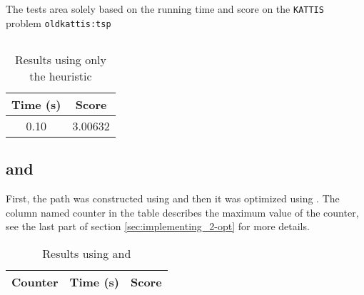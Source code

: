 The tests area solely based on the running time and score on the
\texttt{KATTIS}~\cite{kattis} problem \texttt{oldkattis:tsp}~\cite{kattis-tsp}

\subsection{}
\begin{table}[ht!]
    \centering
    \begin{tabular}{|c|c|}
        \hline 
        \textbf{Time (s)} & \textbf{Score} \\ \hline
        0.10 & 3.00632 \\ \hline
    \end{tabular}
    \caption{Results using only the  heuristic}
    \label{table:nn}
\end{table}

\subsection{ and }
First, the path was constructed using  and then it was
optimized using . The column named counter in the table describes
the maximum value of the counter, see the last part of section
\ref{sec:implementing_2-opt} for more details.
\begin{table}[ht!]
    \centering
    \begin{tabular}{|c|c|c|}
        \hline
        \textbf{Counter} & \textbf{Time (s)} & \textbf{Score} \\ \hline
    \end{tabular}
    \caption{Results using  and }
    \label{table:nn_and_2-opt}
\end{table}
